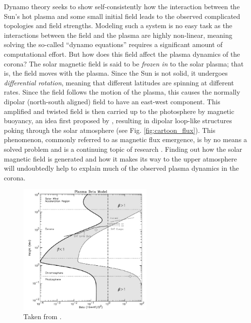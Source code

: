 %
\par Dynamo theory seeks to show self-consistently how the interaction between the Sun's hot plasma and some small initial field leads to the observed complicated topologies and field strengths. Modeling such a system is no easy task as the interactions between the field and the plasma are highly non-linear, meaning solving the so-called ``dynamo equations'' requires a significant amount of computational effort. But how does this field affect the plasma dynamics of the corona? The solar magnetic field is said to be \textit{frozen in} to the solar plasma; that is, the field moves with the plasma. Since the Sun is not solid, it undergoes \textit{differential rotation}, meaning that different latitudes are spinning at different rates. Since the field follows the motion of the plasma, this causes the normally dipolar (north-south aligned) field to have an east-west component. This amplified and twisted field is then carried up to the photosphere by magnetic buoyancy, an idea first proposed by \citep{parker_formation_1955}, resulting in dipolar loop-like structures poking through the solar atmosphere (see Fig. \ref{fig:cartoon_flux}). This phenomenon, commonly referred to as magnetic flux emergence, is by no means a solved problem and is a continuing topic of research \citep[see][]{cheung_flux_2014}. Finding out how the solar magnetic field is generated and how it makes its way to the upper atmosphere will undoubtedly help to explain much of the observed plasma dynamics in the corona. 
%
\begin{figure}
	\centering
	\includegraphics[width=0.6\textwidth]{figures/plasma_beta.png}
	\caption{Taken from \citet{gary_plasma_2001}.}
	\label{fig:plasma_beta}
\end{figure}
%
